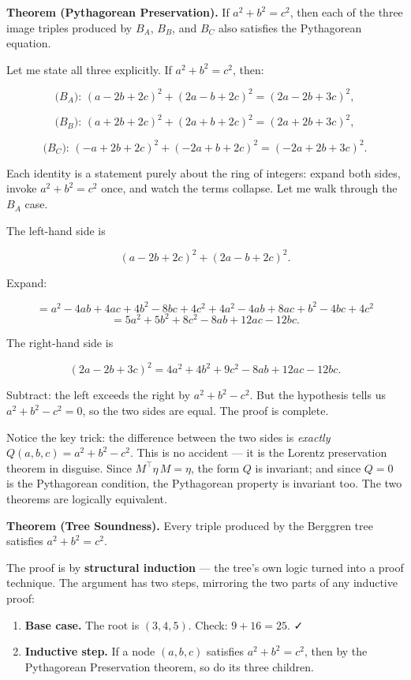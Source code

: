 \textbf{Theorem (Pythagorean Preservation).} If \(a^2 + b^2 = c^2\), then each of the three image triples produced by \(B_A\), \(B_B\), and \(B_C\) also satisfies the Pythagorean equation.

Let me state all three explicitly. If \(a^2 + b^2 = c^2\), then:

\[\text{($B_A$): } (a - 2b + 2c)^2 + (2a - b + 2c)^2 = (2a - 2b + 3c)^2,\]

\[\text{($B_B$): } (a + 2b + 2c)^2 + (2a + b + 2c)^2 = (2a + 2b + 3c)^2,\]

\[\text{($B_C$): } (-a + 2b + 2c)^2 + (-2a + b + 2c)^2 = (-2a + 2b + 3c)^2.\]

Each identity is a statement purely about the ring of integers: expand both sides, invoke \(a^2 + b^2 = c^2\) once, and watch the terms collapse. Let me walk through the \(B_A\) case.

The left-hand side is

\[(a - 2b + 2c)^2 + (2a - b + 2c)^2.\]

Expand:

\[= a^2 - 4ab + 4ac + 4b^2 - 8bc + 4c^2 + 4a^2 - 4ab + 8ac + b^2 - 4bc + 4c^2\] \[= 5a^2 + 5b^2 + 8c^2 - 8ab + 12ac - 12bc.\]

The right-hand side is

\[(2a - 2b + 3c)^2 = 4a^2 + 4b^2 + 9c^2 - 8ab + 12ac - 12bc.\]

Subtract: the left exceeds the right by \(a^2 + b^2 - c^2\). But the hypothesis tells us \(a^2 + b^2 - c^2 = 0\), so the two sides are equal. The proof is complete.

Notice the key trick: the difference between the two sides is \emph{exactly} \(Q(a, b, c) = a^2 + b^2 - c^2\). This is no accident --- it is the Lorentz preservation theorem in disguise. Since \(M^\top \eta\, M = \eta\), the form \(Q\) is invariant; and since \(Q = 0\) is the Pythagorean condition, the Pythagorean property is invariant too. The two theorems are logically equivalent.

\textbf{Theorem (Tree Soundness).} Every triple produced by the Berggren tree satisfies \(a^2 + b^2 = c^2\).

The proof is by \textbf{structural induction} --- the tree's own logic turned into a proof technique. The argument has two steps, mirroring the two parts of any inductive proof:

\begin{enumerate}
\def\labelenumi{\arabic{enumi}.}
\tightlist
\item
  \textbf{Base case.} The root is \((3, 4, 5)\). Check: \(9 + 16 = 25\). ✓
\item
  \textbf{Inductive step.} If a node \((a, b, c)\) satisfies \(a^2 + b^2 = c^2\), then by the Pythagorean Preservation theorem, so do its three children.
\end{enumerate}

